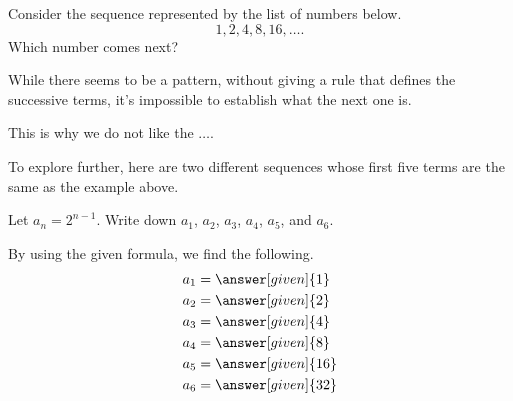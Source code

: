 \documentclass{ximera}
\begin{document}
\begin{question}
  Consider the sequence represented by the list of numbers below.
  \[
  1, 2, 4, 8, 16, \dots.
  \]
Which number comes next? 

While there seems to be a pattern, without giving a rule that defines the successive terms, it's impossible to establish what the next one is. 


This is why we do not like the $\dots$.
\end{question}

To explore further, here are two different sequences whose first five terms are the same as the example above.

\begin{example}
  Let $a_n = 2^{n-1}$.  Write down $a_1$, $a_2$, $a_3$, $a_4$, $a_5$, and
  $a_6$.
  \begin{explanation}
    By using the given formula, we find the following.
    \begin{align*}
      a_1 &= \answer[given]{1}  \\
      a_2 &= \answer[given]{2} \\
      a_3 &= \answer[given]{4} \\
      a_4 &= \answer[given]{8}  \\
      a_5 &= \answer[given]{16} \\ 
      a_6 &= \answer[given]{32}
    \end{align*}
  \end{explanation}
\end{example}
\end{document}
